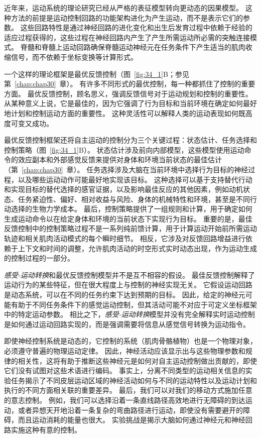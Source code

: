 近年来，运动系统的理论研究已经从严格的表征模型转向更动态的因果模型。
这种方法的前提是运动控制回路的功能架构进化为产生运动，而不是表示它们的参数。
这些回路特性是通过神经回路的进化变化和出生后发育过程中依赖于经验的适应过程获得的，这些过程在神经回路内产生了产生所需运动所必需的突触连接模式。
脊髓和脊髓上运动回路确保脊髓运动神经元在任务条件下产生适当的肌肉收缩信号，而不依赖于坐标变换等计算形式。


一个这样的理论框架是最优反馈控制（图~\ref{fig:34_1}B；参见第~\ref{chap:chap30}~章）。
有许多不同形式的最优控制，每一种都抓住了控制的重要方面。
最优反馈控制，顾名思义，强调反馈信号对于运动规划和控制的重要性。
从某种意义上说，它是最佳的，因为它强调了行为目标和当前环境在确定如何最好地计划和控制运动方面的重要性。
这种灵活性可以解释人类的运动表现如何既高度可变又成功。


最优反馈控制框架还将自主运动的控制分为三个关键过程：状态估计、任务选择和控制策略（图~\ref{fig:34_1}B）。
状态估计涉及前向内部模型，这些模型使用运动命令的效应副本和外部感觉反馈来提供对身体和环境当前状态的最佳估计（第~\ref{chap:chap30}~章）。
任务选择涉及大脑在当前环境中选择行为目标的神经过程，以及哪些运动动作可能最好地实现该目标。
这种选择可以基于支持替代行动和实现目标的替代选择的感官证据，以及影响最佳反应的其他因素，例如动机状态、任务紧迫性、偏好、相对收益与风险、身体的机械特性和环境，甚至是不同行动选择的生物力学成本。
最后，控制策略提供了一组规则和计算，用于确定如何生成运动命令以在给定身体和环境的当前状态下实现行为目标。
重要的是，最佳反馈控制中的控制策略过程不是一系列纯前馈计算，用于计算运动开始前所需运动轨迹和相关肌肉活动模式的每个瞬时细节。
相反，它涉及对反馈回路增益进行依赖于上下文和时间的调整，允许肌肉活动的时空形式实时动态出现，作为运动生成的控制过程的一部分。


\textit{感受-运动转换}和最优反馈控制模型并不是互不相容的假设。
最佳反馈控制解释了运动行为的某些特征，但在很大程度上与控制的神经实现无关。
它假设运动回路是动态系统，可以在不同的任务约束下达到预期的目标。
因此，给定的神经元可能有助于不同任务条件下的感觉运动控制，但其活动可能不对应于可定义坐标框架中的特定运动参数。
相比之下，\textit{感受-运动转换}模型并没有完全解释实时运动控制是如何通过运动回路实现的，而是强调需要将信息从感觉信号转换为运动指令。


即使神经控制系统是动态的，它控制的系统（肌肉骨骼植物）也是一个物理对象，必须遵守普遍的物理运动定律。
因此，神经活动应该显示出与这些物理参数和规律的相关性，这将有助于推断这些神经元是如何对自主运动控制做出贡献的，即使它们没有试图对这些术语进行编码。
事实上，分离不同类型的运动相关信息的实验任务揭示了不同皮层运动区域的神经活动如何与不同的运动特性以及运动计划和执行的不同方面相关联的重要差异。
最后，我们可以对我们的移动方式施加任意的意志控制。
例如，我们可以选择沿着一条直线路径高效地进行无障碍的到达运动，或者异想天开地沿着一条复杂的弯曲路径进行运动，即使没有需要避开的障碍，而且运动消耗的能量也很大。
实验挑战是揭示大脑如何通过神经元和神经回路实施这种有意的控制。



